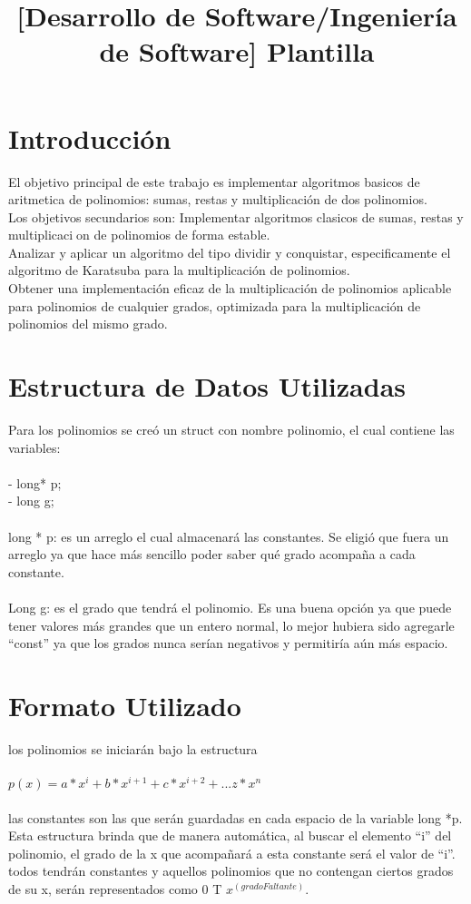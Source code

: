 

\title{[Desarrollo de Software/Ingeniería de Software] Plantilla}




\section{Introducción}

El objetivo principal de este trabajo es implementar algoritmos basicos de
aritmetica de polinomios: sumas, restas y multiplicación de dos polinomios.\\

Los objetivos secundarios son:
Implementar algoritmos clasicos de sumas, restas y multiplicacion de polinomios
de forma estable.\\

Analizar y aplicar un algoritmo del tipo dividir y conquistar, especificamente
el algoritmo de Karatsuba para la multiplicación de polinomios.\\
Obtener una implementación eficaz de la multiplicación de polinomios
aplicable para polinomios de cualquier grados, optimizada para la multiplicación de polinomios del mismo grado.

\section{Estructura de Datos Utilizadas}
Para los polinomios se creó un struct con nombre polinomio, el cual contiene las variables:\\\\
	- long* p;\\
	- long g;\\\\
long * p: es un arreglo el cual almacenará las constantes. Se eligió que fuera un arreglo ya que hace  más sencillo poder saber qué grado acompaña a cada constante.\\\\ 
Long g: es el grado que tendrá el polinomio. Es una buena opción ya que puede tener valores más grandes que un entero normal, lo mejor hubiera sido agregarle “const” ya que los grados nunca serían negativos y permitiría aún más espacio.


\section{Formato Utilizado}

los polinomios se iniciarán bajo la estructura\\\\ 
			$p(x) = a*x^i + b*x^{i+1} + c*x^{i+2} + ...  z*x^n$\\\\
las constantes son las que serán guardadas en cada espacio de la variable long *p. Esta estructura brinda que de manera automática, al buscar el elemento “i” del polinomio, el grado de la x que acompañará a esta constante será el valor de “i”. todos tendrán constantes y aquellos polinomios que no contengan ciertos grados de su x, serán representados como 0 T $x^{(gradoFaltante)}$.


